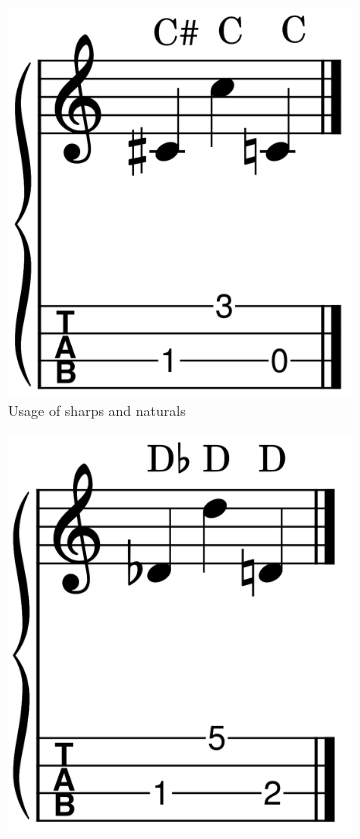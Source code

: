 \begin{figure}[h]
	\begin{subfigure}[b]{0.45\textwidth}
		\centering
		\includegraphics[height=0.15\textheight]{../../MuseScore/Ukulele/UkuleleSharpApplyExample.png}
		\caption{Usage of sharps and naturals}
		\label{fig:ukulele_usage_of_sharps_and_naturals}
	\end{subfigure}
	\hfill
	\begin{subfigure}[b]{0.45\textwidth}
		\centering
		\includegraphics[height=0.15\textheight]{../../MuseScore/Ukulele/UkuleleFlatApplyExample.png}

\end{subfigure}
\end{figure}
